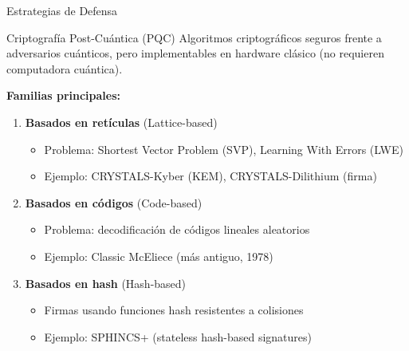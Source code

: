 \documentclass[aspectratio=169]{beamer}
\begin{document}
\begin{frame}{Estrategias de Defensa}
\begin{block}{Criptografía Post-Cuántica (PQC)}
Algoritmos criptográficos seguros frente a adversarios cuánticos, pero implementables en hardware clásico (no requieren computadora cuántica).
\end{block}

\textbf{Familias principales:}
\begin{enumerate}
\item \textbf{Basados en retículas} (Lattice-based)
\begin{itemize}
\item Problema: Shortest Vector Problem (SVP), Learning With Errors (LWE)
\item Ejemplo: CRYSTALS-Kyber (KEM), CRYSTALS-Dilithium (firma)
\end{itemize}

\item \textbf{Basados en códigos} (Code-based)
\begin{itemize}
\item Problema: decodificación de códigos lineales aleatorios
\item Ejemplo: Classic McEliece (más antiguo, 1978)
\end{itemize}

\item \textbf{Basados en hash} (Hash-based)
\begin{itemize}
\item Firmas usando funciones hash resistentes a colisiones
\item Ejemplo: SPHINCS+ (stateless hash-based signatures)
\end{itemize}
\end{enumerate}
\end{frame}
\end{document}
